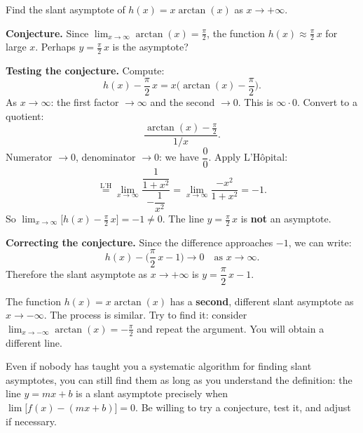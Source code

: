 \begin{example}
\label{ex:6-16}
Find the slant asymptote of $h(x) = x\arctan(x)$ as $x \to +\infty$.

\textbf{Conjecture.}  Since $\displaystyle\lim_{x \to \infty}\arctan(x) = \frac{\pi}{2}$, the function $h(x) \approx \frac{\pi}{2}\,x$ for large $x$.  Perhaps $y = \frac{\pi}{2}\,x$ is the asymptote?

\textbf{Testing the conjecture.}  Compute:
\[
  h(x) - \frac{\pi}{2}\,x = x\biggl(\arctan(x) - \frac{\pi}{2}\biggr).
\]
As $x \to \infty$: the first factor $\to \infty$ and the second $\to 0$.  This is $\infty \cdot 0$.  Convert to a quotient:
\[
  \frac{\arctan(x) - \frac{\pi}{2}}{1/x}.
\]
Numerator $\to 0$, denominator $\to 0$: we have $\dfrac{0}{0}$.  Apply L'H\^opital:
\[
  \stackrel{\text{L'H}}{=} \lim_{x \to \infty}\frac{\dfrac{1}{1+x^{2}}}{-\dfrac{1}{x^{2}}} = \lim_{x \to \infty}\frac{-x^{2}}{1+x^{2}} = -1.
\]
So $\displaystyle\lim_{x \to \infty}\bigl[h(x) - \tfrac{\pi}{2}\,x\bigr] = -1 \neq 0$.  The line $y = \frac{\pi}{2}\,x$ is \textbf{not} an asymptote.

\textbf{Correcting the conjecture.}  Since the difference approaches $-1$, we can write:
\[
  h(x) - \biggl(\frac{\pi}{2}\,x - 1\biggr) \to 0 \quad\text{as } x \to \infty.
\]
Therefore the slant asymptote as $x \to +\infty$ is $y = \dfrac{\pi}{2}\,x - 1$.
\end{example}

\begin{remark}
The function $h(x) = x\arctan(x)$ has a \textbf{second}, different slant asymptote as $x \to -\infty$.  The process is similar.  Try to find it: consider $\displaystyle\lim_{x \to -\infty}\arctan(x) = -\frac{\pi}{2}$ and repeat the argument.  You will obtain a different line.
\end{remark}

\begin{remark}
Even if nobody has taught you a systematic algorithm for finding slant asymptotes, you can still find them as long as you understand the definition: the line $y = mx+b$ is a slant asymptote precisely when $\lim\bigl[f(x) - (mx+b)\bigr] = 0$.  Be willing to try a conjecture, test it, and adjust if necessary.
\end{remark}
